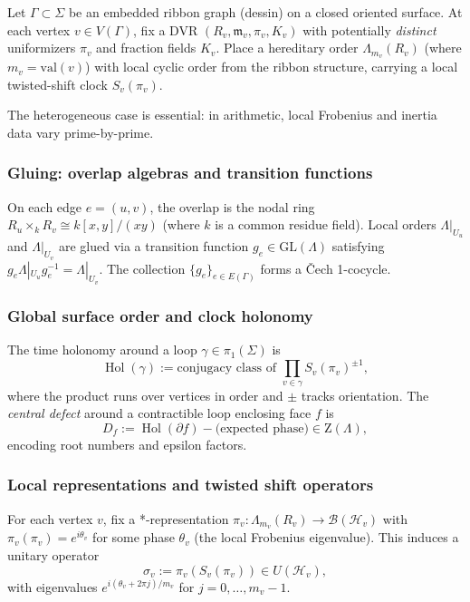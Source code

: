 \documentclass[11pt,oneside]{amsbook}
\numberwithin{equation}{section}
\theoremstyle{plain}
\theoremstyle{definition}
\theoremstyle{remark}
\DeclareMathOperator{\Hol}{\mathrm{Hol}}
\begin{document}
Let $\Gamma \subset \Sigma$ be an embedded ribbon graph (dessin) on a closed oriented surface. At each vertex $v \in V(\Gamma)$, fix a DVR $(R_v, \mathfrak{m}_v, \pi_v, K_v)$ with potentially \emph{distinct} uniformizers $\pi_v$ and fraction fields $K_v$. Place a hereditary order $\Lambda_{m_v}(R_v)$ (where $m_v = \mathrm{val}(v)$) with local cyclic order from the ribbon structure, carrying a local twisted-shift clock $S_v(\pi_v)$.

The heterogeneous case is essential: in arithmetic, local Frobenius and inertia data vary prime-by-prime.

\subsubsection{Gluing: overlap algebras and transition functions}

On each edge $e=(u,v)$, the overlap is the nodal ring $R_u \times_k R_v \cong k[x,y]/(xy)$ (where $k$ is a common residue field). Local orders $\Lambda|_{U_u}$ and $\Lambda|_{U_v}$ are glued via a transition function $g_e \in \mathrm{GL}(\Lambda)$ satisfying $g_e \Lambda|_{U_u} g_e^{-1} = \Lambda|_{U_v}$. The collection $\{g_e\}_{e \in E(\Gamma)}$ forms a Čech 1-cocycle.

\subsubsection{Global surface order and clock holonomy}

The time holonomy around a loop $\gamma \in \pi_1(\Sigma)$ is
\begin{equation}\label{eq:global_time_holonomy_general}
\Hol(\gamma) := \text{conjugacy class of } \prod_{v \in \gamma} S_v(\pi_v)^{\pm 1},
\end{equation}
where the product runs over vertices in order and $\pm$ tracks orientation. The \emph{central defect} around a contractible loop enclosing face $f$ is
\begin{equation}\label{eq:global_defect_general}
D_f := \Hol(\partial f) - \text{(expected phase)} \in \mathrm{Z}(\Lambda),
\end{equation}
encoding root numbers and epsilon factors.

\subsubsection{Local representations and twisted shift operators}

For each vertex $v$, fix a *-representation $\pi_v: \Lambda_{m_v}(R_v) \to \mathcal{B}(\mathcal{H}_v)$ with $\pi_v(\pi_v) = e^{i\theta_v}$ for some phase $\theta_v$ (the local Frobenius eigenvalue). This induces a unitary operator
\[\sigma_v := \pi_v(S_v(\pi_v)) \in U(\mathcal{H}_v),\]
with eigenvalues $e^{i(\theta_v + 2\pi j)/m_v}$ for $j = 0,\ldots,m_v-1$.
\end{document}
